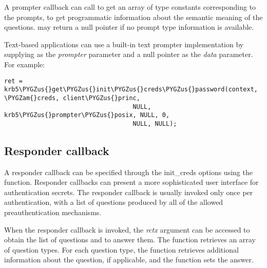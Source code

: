 \documentclass[letterpaper,10pt,english]{sphinxmanual}
\def\PYGZus{\char`\_}
\def\PYGZam{\char`\&}
\begin{document}
A prompter callback can call {\hyperref[appdev/refs/api/krb5_get_prompt_types:c.krb5_get_prompt_types]{}} to get an
array of type constants corresponding to the prompts, to get
programmatic information about the semantic meaning of the questions.
{\hyperref[appdev/refs/api/krb5_get_prompt_types:c.krb5_get_prompt_types]{}} may return a null pointer if no prompt
type information is available.

Text-based applications can use a built-in text prompter
implementation by supplying {\hyperref[appdev/refs/api/krb5_prompter_posix:c.krb5_prompter_posix]{}} as the
\emph{prompter} parameter and a null pointer as the \emph{data} parameter.  For
example:

\begin{Verbatim}[commandchars=\\\{\}]
ret = krb5\PYGZus{}get\PYGZus{}init\PYGZus{}creds\PYGZus{}password(context, \PYGZam{}creds, client\PYGZus{}princ,
                                   NULL, krb5\PYGZus{}prompter\PYGZus{}posix, NULL, 0,
                                   NULL, NULL);
\end{Verbatim}


\subsection{Responder callback}
\label{appdev/init_creds:responder-callback}
A responder callback can be specified through the init\_creds options
using the {\hyperref[appdev/refs/api/krb5_get_init_creds_opt_set_responder:c.krb5_get_init_creds_opt_set_responder]{}} function.
Responder callbacks can present a more sophisticated user interface
for authentication secrets.  The responder callback is usually invoked
only once per authentication, with a list of questions produced by all
of the allowed preauthentication mechanisms.

When the responder callback is invoked, the \emph{rctx} argument can be
accessed to obtain the list of questions and to answer them.  The
{\hyperref[appdev/refs/api/krb5_responder_list_questions:c.krb5_responder_list_questions]{}} function retrieves an array of
question types.  For each question type, the
{\hyperref[appdev/refs/api/krb5_responder_get_challenge:c.krb5_responder_get_challenge]{}} function retrieves additional
information about the question, if applicable, and the
{\hyperref[appdev/refs/api/krb5_responder_set_answer:c.krb5_responder_set_answer]{}} function sets the answer.
\end{document}
